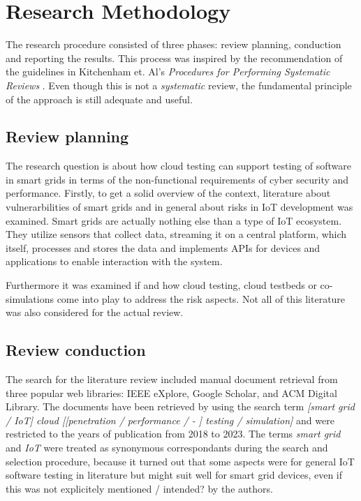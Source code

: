 \section{Research Methodology}
The research procedure consisted of three phases: review planning, conduction and reporting the results. This process was inspired by the recommendation of the guidelines in Kitchenham et. Al's \textit{Procedures for Performing Systematic Reviews} \cite{kitchenham2004procedures}. Even though this is not a \textit{systematic} review, the fundamental principle of the approach is still adequate and useful.

\subsection{Review planning}
The research question is about how cloud testing can support testing of software in smart grids in terms of the non-functional requirements of cyber security and performance. Firstly, to get a solid overview of the context, literature about vulnerarbilities of smart grids and in general about risks in IoT development was examined. Smart grids are actually nothing else than a type of IoT ecosystem. They utilize sensors that collect data, streaming it on a central platform, which itself, processes and stores the data and implements APIs for devices and applications to enable interaction with the system. 

Furthermore it was examined if and how cloud testing, cloud testbeds or co-simulations come into play to address the risk aspects. Not all of this literature was also considered for the actual review.

\subsection{Review conduction}

The search for the literature review included manual document retrieval from three popular web libraries: IEEE eXplore, Google Scholar, and ACM Digital Library. The documents have been retrieved by using the search term \textit{[smart grid / IoT] cloud [[penetration / performance / - ] testing / simulation]} and were restricted to the years of publication from 2018 to 2023. The terms \textit{smart grid} and \textit{IoT} were treated as synonymous correspondants during the search and selection procedure, because it turned out that some aspects were for general IoT software testing in literature but might suit well for smart grid devices, even if this was not explicitely mentioned / intended? by the authors.

